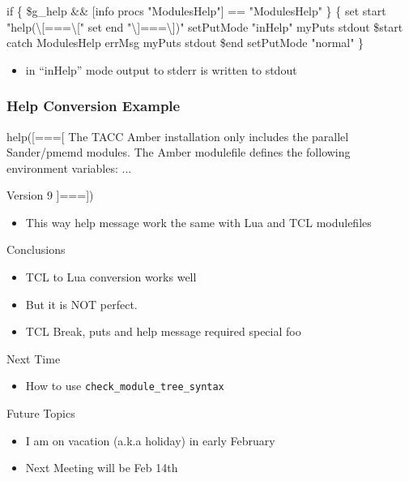 \documentclass{beamer}
\begin{document}
\begin{frame}[fragile]
    \frametitle{}
 {\tiny
    \begin{semiverbatim}
  if \{ \$g\_help && [info procs "ModulesHelp"] == "ModulesHelp" \} \{
      set start "help(\textbackslash[===\textbackslash["
      set end   "\textbackslash]===\textbackslash])"
      setPutMode "inHelp"
      myPuts stdout \$start
      catch { ModulesHelp } errMsg
      myPuts stdout \$end
      setPutMode "normal"
  \}
    \end{semiverbatim}
}
  \begin{itemize}
    \item in ``inHelp'' mode output to stderr is written to stdout
  \end{itemize}
\end{frame}


\begin{frame}[fragile]
    \frametitle{Help Conversion Example}
 {\tiny
    \begin{semiverbatim}
help([===[
The TACC Amber installation only includes the parallel Sander/pmemd modules.
The Amber modulefile defines the following environment variables: ...

Version 9
]===])
    \end{semiverbatim}
}
  \begin{itemize}
    \item This way help message work the same with Lua and TCL modulefiles
  \end{itemize}

\end{frame}

\begin{frame}{Conclusions}
  \begin{itemize}
    \item TCL to Lua conversion works well 
    \item But it is NOT perfect.
    \item TCL Break, puts and help message required special foo
  \end{itemize}
\end{frame}

\begin{frame}{Next Time}
  \begin{itemize}
    \item How to use \texttt{check\_module\_tree\_syntax}
  \end{itemize}
\end{frame}

\begin{frame}{Future Topics}
  \begin{itemize}
    \item I am on vacation (a.k.a holiday) in early February
    \item Next Meeting will be Feb 14th 
  \end{itemize}
\end{frame}
\end{document}
